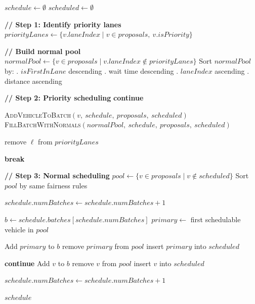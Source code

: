 \documentclass[fleqn,10pt]{olplainarticle}
\begin{document}
\begin{algorithm}[H]
\caption{\textsc{ComputePassOrder}$(proposals)$}
\begin{algorithmic}[1]

\State $schedule \gets \emptyset$
\State $scheduled \gets \emptyset$

\Statex \textbf{// Step 1: Identify priority lanes}
\State $priorityLanes \gets \{ v.laneIndex \mid v \in proposals,\ v.isPriority \}$

\Statex \textbf{// Build normal pool}
\State $normalPool \gets \{ v \in proposals \mid v.laneIndex \notin priorityLanes \}$
\State Sort $normalPool$ by:
\Statex {}. $isFirstInLane$ descending
\Statex {}. wait time descending
\Statex {}. $laneIndex$ ascending
\Statex {}. distance ascending

\Statex \textbf{// Step 2: Priority scheduling}
                    \State \textbf{continue}
                \EndIf

                \State \textsc{AddVehicleToBatch}$(v,\ schedule,\ proposals,\ scheduled)$
                \State \textsc{FillBatchWithNormals}$(normalPool,\ schedule,\ proposals,\ scheduled)$

                    \State remove $\ell$ from $priorityLanes$
                \EndIf

                \State \textbf{break}
            \EndFor
        \EndFor
    \EndWhile
\EndIf

\Statex \textbf{// Step 3: Normal scheduling}
\State $pool \gets \{ v \in proposals \mid v \notin scheduled \}$
\State Sort $pool$ by same fairness rules

    \State $schedule.numBatches \gets schedule.numBatches + 1$
\EndIf

    \State $b \gets schedule.batches[schedule.numBatches]$
    \State $primary \gets$ first schedulable vehicle in $pool$

    \State Add $primary$ to $b$
    \State remove $primary$ from $pool$
    \State insert $primary$ into $scheduled$

            \State \textbf{continue}
        \EndIf
            \State Add $v$ to $b$
            \State remove $v$ from $pool$
            \State insert $v$ into $scheduled$
        \EndIf
    \EndFor

    \State $schedule.numBatches \gets schedule.numBatches + 1$
\EndWhile

\State \Return $schedule$

\end{algorithmic}
\end{algorithm}
\end{document}
